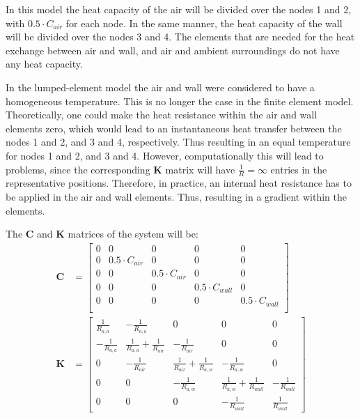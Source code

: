 In this model the heat capacity of the air will be divided over the nodes 1 and 2, with $0.5\cdot C_{air}$ for each node. In the same manner, the heat capacity of the wall will be divided over the nodes 3 and 4. The elements that are needed for the heat exchange between air and wall, and air and ambient surroundings do not have any heat capacity. 

In the lumped-element model the air and wall were considered to have a homogeneous temperature. This is no longer the case in the finite element model. Theoretically, one could make the heat resistance within the air and wall elements zero, which would lead to an instantaneous heat transfer between the nodes 1 and 2, and 3 and 4, respectively. Thus resulting in an equal temperature for nodes 1 and 2, and 3 and 4. 
However, computationally this will lead to problems, since the corresponding $\mathbf{K}$ matrix will have $\frac{1}{R} = \infty$  entries in the representative positions. Therefore, in practice, an internal heat resistance has to be applied in the air and wall elements. Thus, resulting in a gradient within the elements. 

The $\mathbf{C}$ and $\mathbf{K}$ matrices of the system will be:
\begin{equation}
	\begin{aligned}
		\mathbf{C} &= \begin{bmatrix}
			0 & 0 & 0 & 0 & 0 \\
			0 & 0.5 \cdot C_{air} & 0 & 0 & 0 \\
			0 & 0 & 0.5 \cdot C_{air} & 0 & 0 \\
			0 & 0 & 0 & 0.5 \cdot C_{wall} & 0 \\
			0 & 0 & 0 & 0 & 0.5 \cdot C_{wall}\\
		\end{bmatrix}\\
	\mathbf{K} &= \begin{bmatrix}
		\frac{1}{R_{a,a}} & -\frac{1}{R_{a,a}} & 0 & 0 & 0 \\
		-\frac{1}{R_{a,a}} & \frac{1}{R_{a,a}}+\frac{1}{R_{air}} & -\frac{1}{R_{air}} & 0 & 0 \\
		0 & -\frac{1}{R_{air}} & \frac{1}{R_{air}}+\frac{1}{R_{a,w}} & -\frac{1}{R_{a,w}} & 0 \\
		0 & 0 & -\frac{1}{R_{a,w}}& \frac{1}{R_{a,w}}+\frac{1}{R_{wall}} & -\frac{1}{R_{wall}} \\
		0 & 0 & 0 & -\frac{1}{R_{wall}} & \frac{1}{R_{wall}} 
		\end{bmatrix}
	\end{aligned}
\label{eq:CK_finel_house}
\end{equation}


